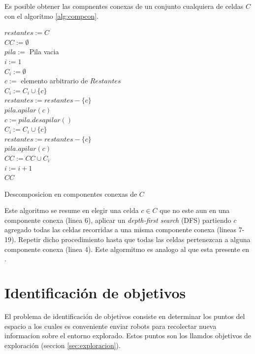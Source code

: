Es posible obtener las compnentes conexas de un conjunto cualquiera de
celdas $C$ con el algoritmo \ref{alg:compcon}.

\begin{algorithm}[H]
\SetAlgoLined
  $restantes := C$ \\
  $CC := \emptyset$ \\
  $pila :=$ Pila vacia \\
  $i := 1$ \\
   {
    $C_i := \emptyset $ \\
    $c :=$ elemento arbitrario de $Restantes$ \\


    $C_i :=  C_i \cup \{c\}$ \\
    $restantes := restantes - \{c\}$ \\
    $pila.apilar(c)$ \\
     {
      $c := pila.desapilar()$ \\
       {
         {
          $C_i :=  C_i \cup \{c\}$ \\
          $restantes := restantes - \{c\}$ \\
          $pila.apilar(c)$ \\
        }
      }
    }
    $CC := CC \cup C_i$ \\
    $i := i + 1$ \\
  }
  \Return $CC$ 

  \caption{Descomposicion en componentes conexas de $C$}
  \label{alg:compcon}
\end{algorithm}

Este algoritmo se resume en elegir una celda $c\in C$ que no este aun en una
componente conexa (linea 6), aplicar un \emph{depth-first search} (DFS)
partiendo $c$ agregado todas las celdas recorridas a una misma componente
conexa (lineas 7-19). Repetir dicho procedimiento hasta que todas las celdas
pertenezcan a alguna componente conexa (linea 4). Este algormitmo es analogo al
que esta presente en \cite{hopcroft1973algorithm}.

\section{Identificación de objetivos}
El problema de identificación de objetivos consiste en determinar los puntos
del espacio a los cuales es conveniente enviar robots para recolectar nueva
informacion sobre el entorno explorado. Estos puntos son los llamdos objetivos
de exploración (seccion \ref{sec:exploracion}). 


